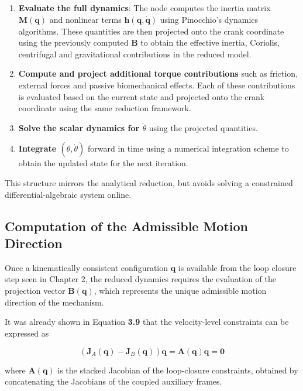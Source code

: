 \begin{enumerate}
    \item \textbf{Evaluate the full dynamics}: The node computes the inertia matrix $\textbf{M}(\textbf{q})$ and nonlinear terms $\textbf{h}(\textbf{q},\dot{\textbf{q}})$ using Pinocchio's dynamics algorithms. These quantities are then projected onto the crank coordinate using the previously computed $\textbf{B}$ to obtain the effective inertia, Coriolis, centrifugal and gravitational contributions in the reduced model.
    
    \item \textbf{Compute and project additional torque contributions} such as friction, external forces and passive biomechanical effects. Each of these contributions is evaluated based on the current state and projected onto the crank coordinate using the same reduction framework.
    
    \item \textbf{Solve the scalar dynamics for $\ddot{\theta}$} using the projected quantities.
    
    \item \textbf{Integrate $(\theta, \dot{\theta})$} forward in time using a numerical integration scheme to obtain the updated state for the next iteration.
\end{enumerate}

This structure mirrors the analytical reduction, but avoids solving a constrained differential-algebraic system online.

\subsection{Computation of the Admissible Motion Direction}
Once a kinematically consistent configuration $\textbf{q}$ is available from the loop closure step seen in Chapter 2, the reduced dynamics requires the evaluation of the projection vector $\textbf{B}(\textbf{q})$, which represents the unique admissible motion direction of the mechanism.

It was already shown in Equation \textbf{3.9} that the velocity-level constraints can be expressed as

\begin{equation*}
(\textbf{J}_A(\textbf{q}) - \textbf{J}_B(\textbf{q}))\dot{\textbf{q}} = \textbf{A}(\textbf{q})\dot{\textbf{q}} = \textbf{0}
\end{equation*}

where $\textbf{A}(\textbf{q})$ is the stacked Jacobian of the loop-closure constraints, obtained by concatenating the Jacobians of the coupled auxiliary frames. 

